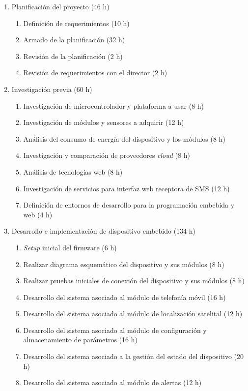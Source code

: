 \documentclass[
11pt, %
]{charter}
\begin{document}
\begin{enumerate}
\item Planificación del proyecto (46 h)
	\begin{enumerate}
	\item Definición de requerimientos (10 h)
	\item Armado de la planificación (32 h)
	\item Revisión de la planificación (2 h)
	\item Revisión de requerimientos con el director (2 h)
	\end{enumerate}
\item Investigación previa (60 h)
	\begin{enumerate}
	\item Investigación de microcontrolador y plataforma a usar (8 h)
	\item Investigación de módulos y sensores a adquirir (12 h)
	\item Análisis del consumo de energía del dispositivo y los módulos (8 h)
	\item Investigación y comparación de proveedores \textit{cloud} (8 h)
	\item Análisis de tecnologías web (8 h)
	\item Investigación de servicios para interfaz web receptora de SMS (12 h)
	\item Definición de entornos de desarrollo para la programación embebida y web (4 h)
	\end{enumerate}
\item Desarrollo e implementación de dispositivo embebido (134 h)
	\begin{enumerate}
	\item \textit{Setup} inicial del firmware (6 h)
	\item Realizar diagrama esquemático del dispositivo y sus módulos (8 h)
	\item Realizar pruebas iniciales de conexión del dispositivo y sus módulos (8 h)
	\item Desarrollo del sistema asociado al módulo de telefonía móvil (16 h)
	\item Desarrollo del sistema asociado al módulo de localización satelital (12 h)
	\item Desarrollo del sistema asociado al módulo de configuración y almacenamiento de parámetros (16 h)
	\item Desarrollo del sistema asociado a la gestión del estado del dispositivo (20 h)
	\item Desarrollo del sistema asociado al módulo de alertas (12 h)

\end{enumerate}
\end{enumerate}
\end{document}
